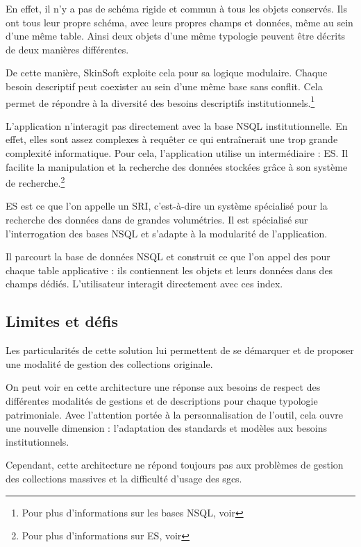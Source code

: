 En effet, il n'y a pas de schéma rigide et commun à tous les objets conservés. Ils ont tous leur propre schéma, avec leurs propres champs et données, même au sein d'une même \gls{table}. Ainsi deux objets d'une même typologie peuvent être décrits de deux manières différentes. 

De cette manière, SkinSoft exploite cela pour sa logique modulaire. Chaque besoin descriptif peut coexister au sein d'une même base sans conflit. Cela permet de répondre à la diversité des besoins descriptifs institutionnels.\footnote{Pour plus d'informations sur les bases \gls{NSQL}, voir } \newline

L'application n'interagit pas directement avec la base \gls{NSQL} institutionnelle. En effet, elles sont assez complexes à requêter ce qui entraînerait une trop grande complexité informatique. Pour cela, l'application utilise un intermédiaire : \gls{ES}. Il facilite la manipulation et la recherche des données stockées grâce à son système de recherche.\footnote{Pour plus d'informations sur \gls{ES}, voir }

\gls{ES} est ce que l'on appelle un \gls{SRI}, c'est-à-dire un système spécialisé pour la recherche des données dans de grandes volumétries. Il est spécialisé sur l'interrogation des bases \gls{NSQL} et s'adapte à la modularité de l'application. 

Il parcourt la base de données \gls{NSQL} et construit ce que l'on appel des  pour chaque \gls{table} applicative : ils contiennent les objets et leurs données dans des champs dédiés. L'utilisateur interagit directement avec ces index. 

\subsection{Limites et défis}

Les particularités de cette solution lui permettent de se démarquer et de proposer une modalité de gestion des collections originale. 

On peut voir en cette architecture une réponse aux besoins de respect des différentes modalités de gestions et de descriptions pour chaque typologie patrimoniale. Avec l'attention portée à la personnalisation de l'outil, cela ouvre une nouvelle dimension : l'adaptation des standards et modèles aux besoins institutionnels.\newline

Cependant, cette architecture ne répond toujours pas aux problèmes de gestion des collections massives et la difficulté d'usage des \glspl{sgc}. 

